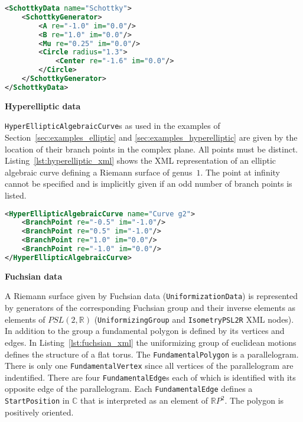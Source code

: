 \documentclass[Thesis.tex]{subfiles}
\begin{document}
\begin{lstlisting}[label=lst:schottky_xml, caption={A torus given by schotty data}, numbers=none, language=XML, captionpos=b]
<SchottkyData name="Schottky">
	<SchottkyGenerator>
		<A re="-1.0" im="0.0"/>
		<B re="1.0" im="0.0"/>
		<Mu re="0.25" im="0.0"/>
		<Circle radius="1.3">
			<Center re="-1.6" im="0.0"/>
		</Circle>
	</SchottkyGenerator>
</SchottkyData>
\end{lstlisting}

{\bf Hyperelliptic data} 

{\tt HyperEllipticAlgebraicCurve}s as used in the examples of Section~\ref{sec:examples_elliptic} and \ref{sec:examples_hyperelliptic} are given by the location of their branch points in the complex plane. All points must be distinct. Listing~\ref{lst:hyperelliptic_xml} shows the XML representation
of an elliptic algebraic curve defining a Riemann surface of genus~$1$. The point at infinity cannot be
specified and is implicitly given if an odd number of branch points is listed.

\begin{lstlisting}[label=lst:hyperelliptic_xml, caption={A torus given as hyperelliptic data}, numbers=none, language=XML, captionpos=b]
<HyperEllipticAlgebraicCurve name="Curve g2">
	<BranchPoint re="-0.5" im="-1.0"/>
	<BranchPoint re="0.5" im="-1.0"/>
	<BranchPoint re="1.0" im="0.0"/>
	<BranchPoint re="-1.0" im="0.0"/>
</HyperEllipticAlgebraicCurve>
\end{lstlisting}

{\bf Fuchsian data}

A Riemann surface given by Fuchsian data ({\tt UniformizationData}) is represented by generators of the corresponding Fuchsian group
and their inverse elements as elements of $PSL(2,\mathbb R)$ ({\tt UniformizingGroup} and {\tt IsometryPSL2R}
XML nodes). In addition to the group a fundamental polygon
is defined by its vertices and edges. In Listing~\ref{lst:fuchsian_xml} the uniformizing group of euclidean
motions defines the structure of a flat torus. The {\tt FundamentalPolygon} is a parallelogram. There is only
one {\tt FundamentalVertex} since all vertices of the parallelogram are indentified. There are four
{\tt FundamentalEdge}s each of which is identified with its opposite edge of the parallelogram. Each {\tt FundamentalEdge} defines a {\tt StartPosition} in $\mathbb C$ that is interpreted as an element of $\mathbb R P^2$. The polygon is positively oriented.
\end{document}
